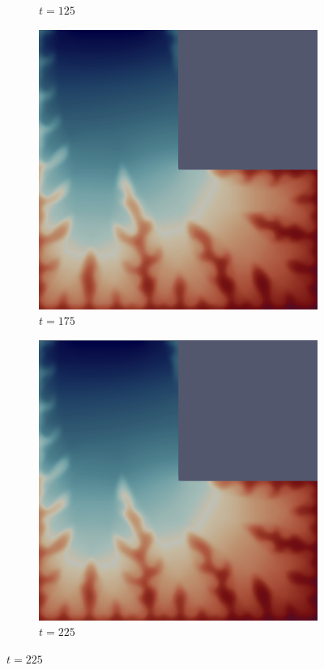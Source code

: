\begin{figure}[H]
\begin{subfigure}{.4\textwidth}
        \caption{$t = 125$}
    \end{subfigure}
    \begin{subfigure}{.4\textwidth}
        \includegraphics[width=\textwidth]{imgs/LShape_Solution/seventh.png}
        \caption{$t = 175$}
    \end{subfigure}
    \begin{subfigure}{.4\textwidth}
        \includegraphics[width=\textwidth]{imgs/LShape_Solution/eighth.png}
        \caption{$t = 225$}
    \end{subfigure}
\end{figure}


